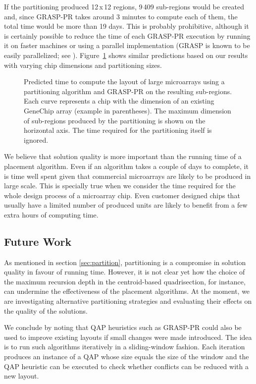 \documentclass{bioinfo}
\begin{document}
If the partitioning produced 12\,x\,12 regions, 9\,409 sub-regions would be created and, since GRASP-PR takes around 3 minutes to compute each of them, the total time would be more than 19 days. This is probably prohibitive, although it is certainly possible to reduce the time of each GRASP-PR execution by running it on faster machines or using a parallel implementation (GRASP is known to be easily parallelized; see \citealp{LI94}). Figure~\ref{fig:time_extrapolation} shows similar predictions based on our results with varying chip dimensions and partitioning sizes.

\begin{figure}
\caption{Predicted time to compute the layout of large microarrays using a partitioning algorithm and GRASP-PR on the resulting sub-regions. Each curve represents a chip with the dimension of an existing GeneChip array (example in parentheses). The maximum dimension of sub-regions produced by the partitioning is shown on the horizontal axis. The time required for the partitioning itself is ignored.}\label{fig:time_extrapolation}
\end{figure}

We believe that solution quality is more important than the running time of a placement algorithm. Even if an algorithm takes a couple of days to complete, it is time well spent given that commercial microarrays are likely to be produced in large scale. This is specially true when we consider the time required for the whole design process of a microarray chip. Even customer designed chips that usually have a limited number of produced units are likely to benefit from a few extra hours of computing time.

\subsection{Future Work}

As mentioned in section \ref{sec:partition}, partitioning is a compromise in solution quality in favour of running time. However, it is not clear yet how the choice of the maximum recursion depth in the centroid-based quadrisection, for instance, can undermine the effectiveness of the placement algorithms. At the moment, we are investigating alternative partitioning strategies and evaluating their effects on the quality of the solutions.

We conclude by noting that QAP heuristics such as GRASP-PR could also be used to improve existing layouts if small changes were made introduced. The idea is to run such algorithms iteratively in a sliding-window fashion. Each iteration produces an instance of a QAP whose size equals the size of the window and the QAP heuristic can be executed to check whether conflicts can be reduced with a new layout.
\end{document}
